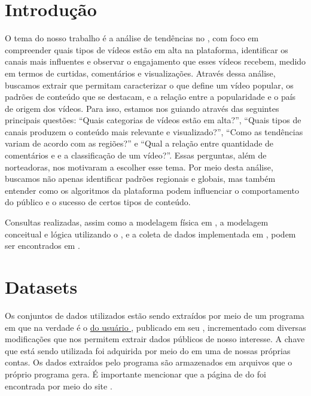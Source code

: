 \chapter{Introdução}

  O tema do nosso trabalho é a análise de tendências no , com foco em compreender quais tipos de vídeos estão em alta na plataforma, identificar os canais mais influentes e observar o engajamento que esses vídeos recebem, medido em termos de curtidas, comentários e visualizações. Através dessa análise, buscamos extrair  que permitam caracterizar o que define um vídeo popular, os padrões de conteúdo que se destacam, e a relação entre a popularidade e o país de origem dos vídeos. Para isso, estamos nos guiando através das seguintes principais questões: ``Quais categorias de vídeos estão em alta?'', ``Quais tipos de canais produzem o conteúdo mais relevante e visualizado?'', ``Como as tendências variam de acordo com as regiões?'' e ``Qual a relação entre quantidade de comentários e  e a classificação de um vídeo?''. Essas perguntas, além de norteadoras, nos motivaram a escolher esse tema. Por meio desta análise, buscamos não apenas identificar padrões regionais e globais, mas também entender como os algoritmos da plataforma podem influenciar o comportamento do público e o sucesso de certos tipos de conteúdo.

  Consultas realizadas, assim como a modelagem física em , a modelagem conceitual e lógica utilizando
  o , e a coleta de dados implementada em , podem ser encontrados
  em \cite{our-YoutubeScraperDataBank}.

\chapter{Datasets}

  Os conjuntos de dados utilizados estão sendo extraídos por meio de um programa em  que na verdade é o \href{https://github.com/mitchelljy/Trending-YouTube-Scraper}{ do usuário }, publicado em seu \href{https://github.com/mitchelljy}{}, incrementado com diversas modificações que nos permitem extrair dados públicos de nosso interesse. A chave \href{https://developers.google.com/youtube/v3/docs?hl=pt-br}{} que está sendo utilizada foi adquirida por meio do  em uma de nossas próprias contas. Os dados extraídos pelo programa são armazenados em arquivos  que o próprio programa gera. É importante mencionar que a página de  do  foi encontrada por meio do site \cite{kaggle}.

